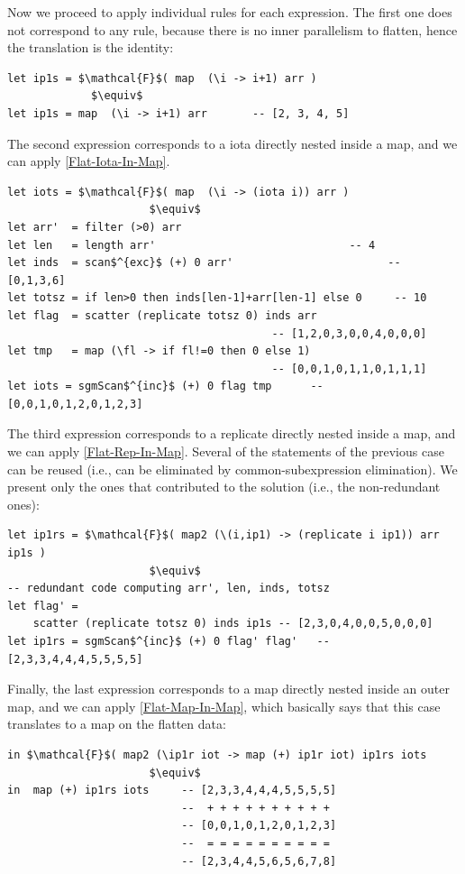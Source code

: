 \documentclass[acmsmall,review]{acmart}\settopmatter{printfolios=true,printccs=false,printacmref=false}
\begin{document}
Now we proceed to apply individual rules for each expression.
The first one does not correspond to any rule, because there is
no inner parallelism to flatten, hence the translation is the identity:
\begin{lstlisting}[mathescape=true]
let ip1s = $\mathcal{F}$( map  (\i -> i+1) arr ) 
             $\equiv$
let ip1s = map  (\i -> i+1) arr       -- [2, 3, 4, 5]
\end{lstlisting}\vspace{-2ex}

The second expression corresponds to a iota directly nested inside a map,
and we can apply \cref{Flat-Iota-In-Map}.
\begin{lstlisting}[mathescape=true]
let iots = $\mathcal{F}$( map  (\i -> (iota i)) arr )  
                      $\equiv$
let arr'  = filter (>0) arr
let len   = length arr'                              -- 4
let inds  = scan$^{exc}$ (+) 0 arr'                        -- [0,1,3,6]
let totsz = if len>0 then inds[len-1]+arr[len-1] else 0     -- 10
let flag  = scatter (replicate totsz 0) inds arr
                                         -- [1,2,0,3,0,0,4,0,0,0]
let tmp   = map (\fl -> if fl!=0 then 0 else 1) 
                                         -- [0,0,1,0,1,1,0,1,1,1]
let iots = sgmScan$^{inc}$ (+) 0 flag tmp      -- [0,0,1,0,1,2,0,1,2,3]
\end{lstlisting}\vspace{-2ex}

The third expression corresponds to a replicate directly nested inside a map,
and we can apply \cref{Flat-Rep-In-Map}. Several of the statements of the 
previous case can be reused (i.e., can be eliminated by common-subexpression
elimination). We present only the ones that contributed to the solution
(i.e., the non-redundant ones):\medskip
\begin{lstlisting}[mathescape=true]
let ip1rs = $\mathcal{F}$( map2 (\(i,ip1) -> (replicate i ip1)) arr ip1s )
                      $\equiv$
-- redundant code computing arr', len, inds, totsz
let flag' = 
    scatter (replicate totsz 0) inds ip1s -- [2,3,0,4,0,0,5,0,0,0]
let ip1rs = sgmScan$^{inc}$ (+) 0 flag' flag'   -- [2,3,3,4,4,4,5,5,5,5]
\end{lstlisting}\vspace{-2ex}

Finally, the last expression corresponds to a map directly nested inside
an outer map, and we can apply \cref{Flat-Map-In-Map}, which basically says
that this case translates to a map on the flatten data:
\begin{lstlisting}[mathescape=true]
in $\mathcal{F}$( map2 (\ip1r iot -> map (+) ip1r iot) ip1rs iots
                      $\equiv$
in  map (+) ip1rs iots     -- [2,3,3,4,4,4,5,5,5,5]
                           --  + + + + + + + + + +
                           -- [0,0,1,0,1,2,0,1,2,3]
                           --  = = = = = = = = = =
                           -- [2,3,4,4,5,6,5,6,7,8]
\end{lstlisting}\vspace{-2ex}
\end{document}

